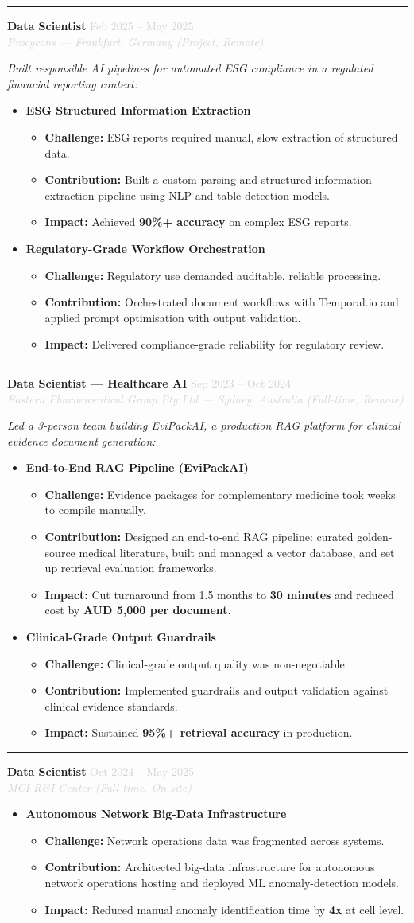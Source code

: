 \documentclass[10pt, letterpaper]{article}
\newcommand{\jobsep}{%
  \vspace{3pt}
  \noindent\textcolor{rulegray}{\rule{\linewidth}{0.3pt}}
  \vspace{4pt}
}
\newcommand{\job}[3]{%
  \noindent
  \textbf{#1} \hfill \textcolor{lightgray}{\small #3}\\
  \textit{\textcolor{lightgray}{#2}}
  \vspace{2pt}
}
\newcommand{\achievement}[4]{%
  \item \textbf{#1}
  \begin{itemize}
    \item \textbf{Challenge:} #2
    \item \textbf{Contribution:} #3
    \item \textbf{Impact:} #4
  \end{itemize}
}
\begin{document}
\jobsep

\job{Data Scientist}{Procycons --- Frankfurt, Germany \textup{(Project, Remote)}}{Feb 2025 -- May 2025}
\textit{Built responsible AI pipelines for automated ESG compliance in a regulated financial reporting context:}
\begin{itemize}
  \achievement{ESG Structured Information Extraction}
    {ESG reports required manual, slow extraction of structured data.}
    {Built a custom parsing and structured information extraction pipeline using NLP and table-detection models.}
    {Achieved \textbf{90\%+ accuracy} on complex ESG reports.}
  \achievement{Regulatory-Grade Workflow Orchestration}
    {Regulatory use demanded auditable, reliable processing.}
    {Orchestrated document workflows with Temporal.io and applied prompt optimisation with output validation.}
    {Delivered compliance-grade reliability for regulatory review.}
\end{itemize}

\jobsep

\job{Data Scientist --- Healthcare AI}{Eastern Pharmaceutical Group Pty Ltd --- Sydney, Australia \textup{(Full-time, Remote)}}{Sep 2023 -- Oct 2024}
\textit{Led a 3-person team building EviPackAI, a production RAG platform for clinical evidence document generation:}
\begin{itemize}
  \achievement{End-to-End RAG Pipeline (EviPackAI)}
    {Evidence packages for complementary medicine took weeks to compile manually.}
    {Designed an end-to-end RAG pipeline: curated golden-source medical literature, built and managed a vector database, and set up retrieval evaluation frameworks.}
    {Cut turnaround from 1.5 months to \textbf{30 minutes} and reduced cost by \textbf{AUD 5,000 per document}.}
  \achievement{Clinical-Grade Output Guardrails}
    {Clinical-grade output quality was non-negotiable.}
    {Implemented guardrails and output validation against clinical evidence standards.}
    {Sustained \textbf{95\%+ retrieval accuracy} in production.}
\end{itemize}

\jobsep

\job{Data Scientist}{MCI R\&I Center \textup{(Full-time, On-site)}}{Oct 2024 -- May 2025}
\begin{itemize}
  \achievement{Autonomous Network Big-Data Infrastructure}
    {Network operations data was fragmented across systems.}
    {Architected big-data infrastructure for autonomous network operations hosting and deployed ML anomaly-detection models.}
    {Reduced manual anomaly identification time by \textbf{4x} at cell level.}
\end{itemize}
\end{document}
